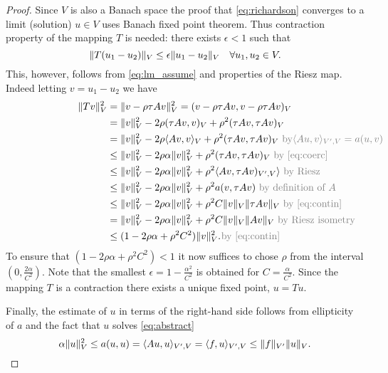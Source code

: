 \begin{proof}
  Since $V$ is also a Banach space the proof that \eqref{eq:richardson}
  converges to a limit (solution) $u\in V$ uses Banach fixed point theorem. Thus
  contraction property of the mapping $T$ is needed: there exists $\epsilon < 1$
  such that
  \[
    \lVert T(u_1 - u_2)\rVert_V \leq \epsilon \lVert u_1 - u_2\rVert_V \quad \forall u_1, u_2\in V.
  \]
  This, however, follows from \eqref{eq:lm_assume} and properties of the Riesz
  map. Indeed letting $v=u_1-u_2$ we have
    \[
  \begin{split}
    \norm{Tv}^2_V &= \norm{v-\rho\tau A v}^2_V = (v-\rho\tau A v, v-\rho\tau A v)_V\\
                &=\norm{v}^2_V - 2\rho(\tau A v, v)_V + \rho^2(\tau A v, \tau A v)_V\\
                &=\norm{v}^2_V - 2\rho\brack{A v, v}_V + \rho^2(\tau A v, \tau Av)_V
                \mathrlap{\textcolor{gray}{\text{ by} \brack{Au, v}_{\dual{V}, V}=a(u, v)}}\\
                &\leq \norm{v}^2_V - 2\rho\alpha\norm{v}^2_V + \rho^2(\tau A v, \tau Av)_V
                \mathrlap{\textcolor{gray}{\text{ by \eqref{eq:coerc}}}}\\
                &\leq \norm{v}^2_V - 2\rho\alpha\norm{v}^2_V + \rho^2\brack{A v, \tau Av)_{\dual{V}, V}}
                \mathrlap{\textcolor{gray}{\text{ by Riesz}}}\\
                &\leq \norm{v}^2_V - 2\rho\alpha\norm{v}^2_V + \rho^2 a(v, \tau Av)
                \mathrlap{\textcolor{gray}{\text{ by definition of } A}}\\
                &\leq \norm{v}^2_V - 2\rho\alpha\norm{v}^2_V + \rho^2 C
                \norm{v}_V\norm{\tau Av}_V
                \mathrlap{\textcolor{gray}{\text{ by \eqref{eq:contin}}}}\\
                &= \norm{v}^2_V - 2\rho\alpha\norm{v}^2_V + \rho^2 C \norm{v}_V\norm{Av}_V
                \mathrlap{\textcolor{gray}{\text{ by Riesz isometry }}}\\
                &\leq (1 - 2\rho\alpha + \rho^2 C^2)\norm{v}^2_V
                \mathrlap{\textcolor{gray}{\text{ by \eqref{eq:contin}}}}.\\
  \end{split}
    \]
  To ensure that $(1 - 2\rho\alpha + \rho^2 C^2) < 1$ it now suffices to chose
  $\rho$ from the interval $(0, \tfrac{2\alpha}{C^2})$. Note that the smallest
  $\epsilon=1-\tfrac{\alpha^2}{C^2}$ is obtained for $C=\tfrac{\alpha}{C^2}$. Since
  the mapping $T$ is a contraction there exists a unique fixed point, $u=Tu$.

  Finally, the estimate of $u$ in terms of the right-hand side follows 
    from ellipticity of $a$ and the fact that $u$ solves \eqref{eq:abstract}
  \[
    \alpha\lVert u\rVert^2_V \leq a(u, u) = \langle A u, u\rangle_{V^{\prime}, V} = 
    \langle f, u\rangle_{V^{\prime}, V} \leq \lVert f\rVert_{V^{\prime}}\lVert u\rVert_V.
  \]
  \end{proof}
  
